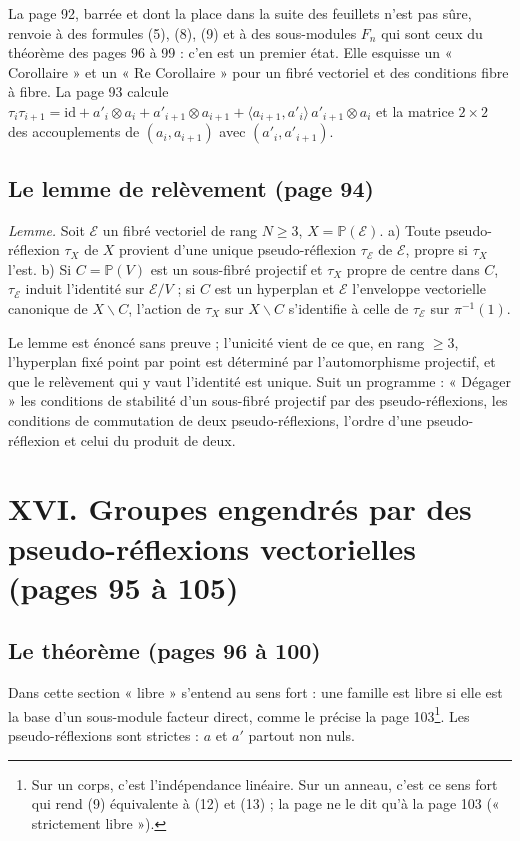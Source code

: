 \documentclass[11pt,a4paper]{article}
\begin{document}
La page 92, barrée et dont la place dans la suite des feuillets n'est pas sûre,
renvoie à des formules (5), (8), (9) et à des sous-modules $F_n$ qui sont ceux du
théorème des pages 96 à 99 : c'en est un premier état. Elle esquisse un
« Corollaire » et un « Re Corollaire » pour un fibré vectoriel et des conditions
fibre à fibre. La page 93 calcule $\tau_i\tau_{i+1} = \mathrm{id} + a'_i \otimes
a_i + a'_{i+1} \otimes a_{i+1} + \langle a_{i+1}, a'_i \rangle\, a'_{i+1}
\otimes a_i$ et la matrice $2 \times 2$ des accouplements de $(a_i, a_{i+1})$
avec $(a'_i, a'_{i+1})$.

\subsection*{Le lemme de relèvement (page 94)}

\emph{Lemme.} Soit $\mathcal{E}$ un fibré vectoriel de rang $N \geqslant 3$, $X =
\mathbb{P}(\mathcal{E})$. a) Toute pseudo-réflexion $\tau_X$ de $X$ provient
d'une unique pseudo-réflexion $\tau_\mathcal{E}$ de $\mathcal{E}$, propre si
$\tau_X$ l'est. b) Si $C = \mathbb{P}(V)$ est un sous-fibré projectif et
$\tau_X$ propre de centre dans $C$, $\tau_\mathcal{E}$ induit l'identité sur
$\mathcal{E}/V$ ; si $C$ est un hyperplan et $\mathcal{E}$ l'enveloppe
vectorielle canonique de $X \smallsetminus C$, l'action de $\tau_X$ sur $X
\smallsetminus C$ s'identifie à celle de $\tau_\mathcal{E}$ sur $\pi^{-1}(1)$.

Le lemme est énoncé sans preuve ; l'unicité vient de ce que, en rang $\geqslant
3$, l'hyperplan fixé point par point est déterminé par l'automorphisme
projectif, et que le relèvement qui y vaut l'identité est unique. Suit un
programme : « Dégager » les conditions de stabilité d'un sous-fibré projectif par
des pseudo-réflexions, les conditions de commutation de deux pseudo-réflexions,
l'ordre d'une pseudo-réflexion et celui du produit de deux.

\section*{XVI. Groupes engendrés par des pseudo-réflexions vectorielles (pages 95 à 105)}

\subsection*{Le théorème (pages 96 à 100)}

Dans cette section « libre » s'entend au sens fort : une famille est libre si
elle est la base d'un sous-module facteur direct, comme le précise la page
103\footnote{Sur un corps, c'est l'indépendance linéaire. Sur un anneau,
c'est ce sens fort qui rend (9) équivalente à (12) et (13) ; la page ne le dit
qu'à la page 103 (« strictement libre »).}. Les pseudo-réflexions sont
strictes : $a$ et $a'$ partout non nuls.
\end{document}
